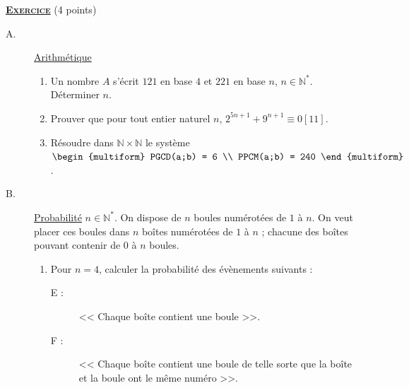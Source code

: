 \providecommand{\dx}{\mathrm{d}x}
\providecommand{\Re}[1]{\mathrm{Re}\left( #1 \right)}
\providecommand{\Im}[1]{\mathrm{Im}\left( #1 \right)}
\providecommand{\dt}{\mathrm{d}t}
%
\noindent \underline{\textsc{\textbf{Exercice}}} (4 points) \\[-1\baselineskip]
%
      \begin{description}
            \item[A.] \underline{Arithm\'etique} \newline
                  \begin{enumerate}
                        \item Un nombre $A$ s'\'ecrit $121$ en base $4$ et 
                              $221$ en base $n$, $n\in\mathbb{N}^*$. D\'eterminer $n$.
                        \item Prouver que pour tout entier naturel $n$, 
                              $2^{5n+1} + 9^{n+1} \equiv 0 [11]$.
                        \item R\'esoudre dans $\mathbb{N}\times\mathbb{N}$ le syst\`eme
                              $\begin{multiform} PGCD(a;b) = 6 \\ PPCM(a;b) = 240 \end{multiform}$.
                  \end{enumerate}
            \item[B.] \underline{Probabilit\'e} \newline
                  $n\in\mathbb{N}^*$.
                  On dispose de $n$ boules num\'erot\'ees de $1$ \`a $n$.
                  On veut placer ces boules dans $n$ bo\^ites num\'erot\'ees de $1$ \`a $n$ ;
                  chacune des bo\^ites pouvant contenir de $0$ \`a $n$ boules.
                  \begin{enumerate}
                        \item Pour $n=4$, calculer la probabilit\'e des \'ev\`enements suivants :
                              \begin{description}
                                    \item[E :] << Chaque bo\^ite contient une boule >>.
                                    \item[F :] << Chaque bo\^ite contient une boule de telle sorte que la bo\^ite et la boule ont le m\^eme num\'ero >>.

\end{description}
\end{enumerate}
\end{description}
